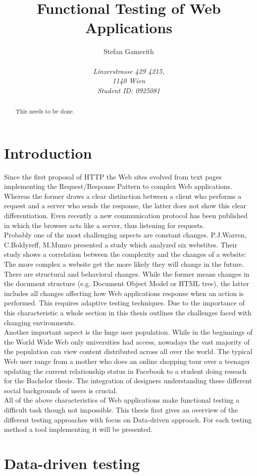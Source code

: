 \documentclass[12pt, notitlepage]{article}
\title{Functional Testing of Web Applications}
\author{Stefan Gamerith\\\\
		\emph{Linzerstrasse 429 4215,}\\
		\emph{1140 Wien}\\
		\emph{Student ID: 0925081}}
\begin{document}
	\maketitle
	
	\begin{abstract}
		This needs to be done.
	\end{abstract}
	
	\tableofcontents
	
\section*{Introduction}
Since the first proposal of HTTP\cite{http-proposal} the Web sites evolved from 
text pages implementing the Request/Response Pattern\cite{request-response}  to  
complex Web applications. Whereas the former draws a clear distinction between a client
who performs a request and a server who sends the response, the latter does not show this 
clear differentiation. Even recently a new communication protocol\cite{web-socket} has been published 
in which the browser acts like a server, thus listening for requests. \\
 
Probably one of the most challenging aspects are constant changes. P.J.Warren, C.Boldyreff, M.Munro \cite{html-evolution}
presented a study which analyzed six webstites. Their study shows a correlation between the complexity and the changes of
a website: The more complex a website get the more likely they will change in the future. 
There are structural and behavioral changes. While the former means changes in the document structure (e.g. Document Object Model\cite{dom} or HTML tree), the latter
includes all changes affecting how Web applications response when an action is performed. 
This requires adaptive testing techniques. Due to the importance of this characteristic a whole section in this thesis outlines the challenges faced
with changing environments.\\ 

Another important aspect is the huge user population. While in the beginnings of the World Wide Web only universities had access,
nowadays the vast majority of the population can view content distributed across all over the world. The typical Web user range from a
mother who does an online shopping tour over a teenager updating the current relationship status in Facebook to a student doing reseach for
the Bachelor thesis. The integration of designers understanding these different social backgrounds of users is crucial. \\


All of the above characteristics of Web applications make functional testing a difficult task though not impossible.
This thesis first gives an overview of the different testing approaches with focus on Data-driven approach. For each 
testing method a tool implementing it will be presented. 


\section{Data-driven testing}
\end{document}
